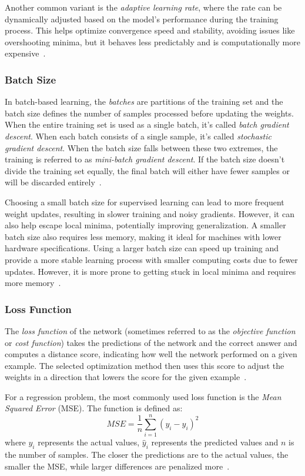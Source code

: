 \documentclass[a4paper,oneside,onecolumn,12pt]{book}
\begin{document}
		Another common variant is the \textit{adaptive learning rate}, where the rate can be dynamically adjusted based on the model's performance during the training process. This helps optimize convergence speed and stability, avoiding issues like overshooting minima, but it behaves less predictably and is computationally more expensive~\cite{LRSALRMDL}.

		\subsubsection{Batch Size}
		In batch-based learning, the \textit{batches} are partitions of the training set and the batch size defines the number of samples processed before updating the weights. When the entire training set is used as a single batch, it's called \textit{batch gradient descent}. When each batch consists of a single sample, it's called \textit{stochastic gradient descent}. When the batch size falls between these two extremes, the training is referred to as \textit{mini-batch gradient descent}. If the batch size doesn't divide the training set equally, the final batch will either have fewer samples or will be discarded entirely~\cite{DBBENN}.

		Choosing a small batch size for supervised learning can lead to more frequent weight updates, resulting in slower training and noisy gradients. However, it can also help escape local minima, potentially improving generalization. A smaller batch size also requires less memory, making it ideal for machines with lower hardware specifications. Using a larger batch size can speed up training and provide a more stable learning process with smaller computing costs due to fewer updates. However, it is more prone to getting stuck in local minima and requires more memory~\cite{HDBSIYML}.

		\subsubsection{Loss Function}
		The \textit{loss function} of the network (sometimes referred to as the \textit{objective function} or \textit{cost function}) takes the predictions of the network and the correct answer and computes a distance score, indicating how well the network performed on a given example. The selected optimization method then uses this score to adjust the weights in a direction that lowers the score for the given example~\cite{DLP}.

		For a regression problem, the most commonly used loss function is the \textit{Mean Squared Error} (MSE). The function is defined as:
		\[ MSE = \frac{1}{n} \sum_{i=1}^{n} (y_i - \hat{y}_i)^2 \]
		where $y_i$ represents the actual values, $\hat{y}_i$ represents the predicted values and $n$ is the number of samples. The closer the predictions are to the actual values, the smaller the MSE, while larger differences are penalized more~\cite{AISL}.
\end{document}
